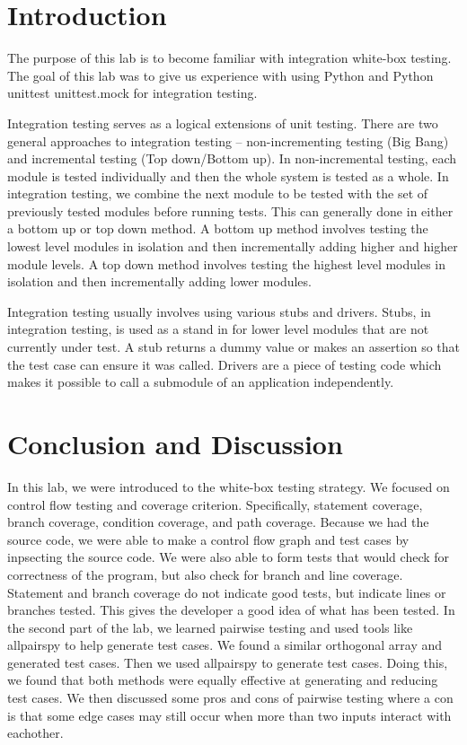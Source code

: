 \documentclass[12pt, letterpaper, titlepage]{article}
\begin{document}
 
\singlespacing

\section{Introduction}
The purpose of this lab is to become familiar with integration white-box testing. The goal of this lab was to give us experience with using Python and Python unittest unittest.mock for integration testing.

Integration testing serves as a logical extensions of unit testing. There are two general approaches to integration testing -- non-incrementing testing (Big Bang) and incremental testing (Top down/Bottom up). In non-incremental testing, each module is tested individually and then the whole system is tested as a whole. In integration testing, we combine the next module to be tested with the set of previously tested modules before running tests. This can generally done in either a bottom up or top down method. A bottom up method involves testing the lowest level modules in isolation and then incrementally adding higher and higher module levels. A top down method involves testing the highest level modules in isolation and then incrementally adding lower modules.

Integration testing usually involves using various stubs and drivers. Stubs, in integration testing, is used as a stand in for lower level modules that are not currently under test. A stub returns a dummy value or makes an assertion so that the test case can ensure it was called. Drivers are a piece of testing code which makes it possible to call a submodule of an application independently.


\section{Conclusion and Discussion}
In this lab, we were introduced to the white-box testing strategy. We focused on control flow testing and coverage criterion. Specifically, statement coverage, branch coverage, condition coverage, and path coverage. Because we had the source code, we were able to make a control flow graph and test cases by inpsecting the source code. We were also able to form tests that would check for correctness of the program, but also check for branch and line coverage. Statement and branch coverage do not indicate good tests, but indicate lines or branches tested. This gives the developer a good idea of what has been tested. In the second part of the lab, we learned pairwise testing and used tools like allpairspy to help generate test cases. We found a similar orthogonal array and generated test cases. Then we used allpairspy to generate test cases. Doing this, we found that both methods were equally effective at generating and reducing test cases. We then discussed some pros and cons of pairwise testing where a con is that some edge cases may still occur when more than two inputs interact with eachother.
\end{document}

